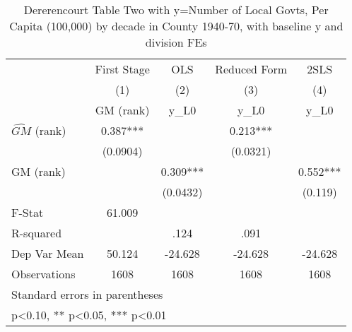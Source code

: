 \begin{table}[htbp]\centering
\def\sym#1{\ifmmode^{#1}\else\(^{#1}\)\fi}
\caption{Dererencourt Table Two with y=Number of Local Govts, Per Capita (100,000) by decade in County 1940-70, with baseline y and division FEs}
\begin{tabular}{l*{4}{c}}
\toprule
                    & First Stage   &         OLS   &Reduced Form   &        2SLS   \\
                    &\multicolumn{1}{c}{(1)}&\multicolumn{1}{c}{(2)}&\multicolumn{1}{c}{(3)}&\multicolumn{1}{c}{(4)}\\
                    &\multicolumn{1}{c}{GM  (rank)}&\multicolumn{1}{c}{y\_L0}&\multicolumn{1}{c}{y\_L0}&\multicolumn{1}{c}{y\_L0}\\
\midrule
$\hat{GM}$ (rank)   &       0.387***&               &       0.213***&               \\
                    &    (0.0904)   &               &    (0.0321)   &               \\
\addlinespace
GM  (rank)          &               &       0.309***&               &       0.552***\\
                    &               &    (0.0432)   &               &     (0.119)   \\
\midrule
F-Stat              &      61.009   &               &               &               \\
R-squared           &               &        .124   &        .091   &               \\
Dep Var Mean        &      50.124   &     -24.628   &     -24.628   &     -24.628   \\
Observations        &        1608   &        1608   &        1608   &        1608   \\
\bottomrule
\multicolumn{5}{l}{\footnotesize Standard errors in parentheses}\\
\multicolumn{5}{l}{\footnotesize * p<0.10, ** p<0.05, *** p<0.01}\\
\end{tabular}
\end{table}
